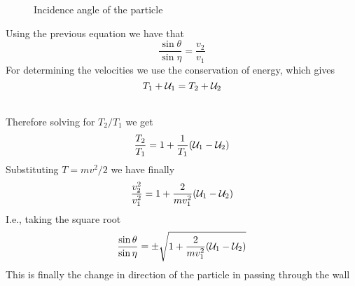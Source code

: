 \documentclass[../admech.tex]{subfiles}
\begin{document}
\begin{exe}
\begin{minipage}[c]{0.5\textwidth}
\begin{figure}[H]
			\caption{Incidence angle of the particle}
			\label{fig:incang}
		\end{figure}
	\end{minipage}\begin{minipage}[c]{0.5\textwidth}
		Using the previous equation we have that
		\begin{equation*}
			\frac{\sin\theta}{\sin\eta}=\frac{v_2}{v_1}
		\end{equation*}
		For determining the velocities we use the conservation of energy, which gives
		\begin{equation*}
			T_1+\mathcal{U}_1=T_2+\mathcal{U}_2
		\end{equation*}
	\end{minipage}\\
	Therefore solving for $T_2/T_1$ we get
	\begin{equation*}
		\frac{T_2}{T_1}=1+\frac{1}{T_1}(\mathcal{U}_1-\mathcal{U}_2)
	\end{equation*}
	Substituting $T=mv^2/2$ we have finally
	\begin{equation*}
		\frac{v^2_2}{v^2_1}=1+\frac{2}{mv^2_1}(\mathcal{U}_1-\mathcal{U}_2)
	\end{equation*}
	I.e., taking the square root
	\begin{equation*}
		\frac{\sin\theta}{\sin\eta}=\pm\sqrt{1+\frac{2}{mv^2_1}(\mathcal{U}_1-\mathcal{U}_2)}
	\end{equation*}
	This is finally the change in direction of the particle in passing through the wall
\end{exe}
\end{document}
